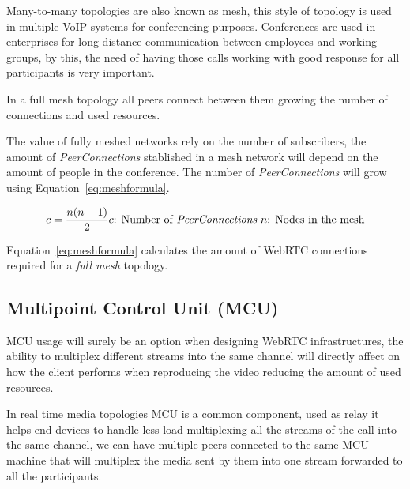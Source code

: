 Many-to-many topologies are also known as mesh, this style of topology is used in multiple VoIP systems for conferencing purposes. Conferences are used in enterprises for long-distance communication between employees and working groups, by this, the need of having those calls working with good response for all participants is very important.

In a full mesh topology all peers connect between them growing the number of connections and used resources.

The value of fully meshed networks rely on the number of subscribers, the amount of {\it PeerConnections} stablished in a mesh network will depend on the amount of people in the conference. The number of {\it PeerConnections} will grow using Equation~\ref{eq:meshformula}.

\begin{equation}
	\label{eq:meshformula}
	c = \frac{n(n-1)}{2}\\
	
	c \text{: Number of {\it PeerConnections}}\
		
	n \text{: Nodes in the mesh}
\end{equation}

Equation~\ref{eq:meshformula} calculates the amount of WebRTC connections required for a {\it full mesh} topology. 


\subsection{Multipoint Control Unit (MCU) }

MCU usage will surely be an option when designing WebRTC infrastructures, the ability to multiplex different streams into the same channel will directly affect on how the client performs when reproducing the video reducing the amount of used resources. 

In real time media topologies MCU is a common component, used as relay it helps end devices to handle less load multiplexing all the streams of the call into the same channel, we can have multiple peers connected to the same MCU machine that will multiplex the media sent by them into one stream forwarded to all the participants.

